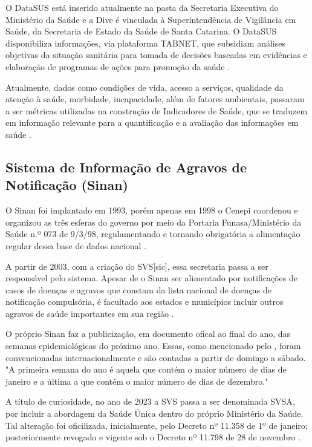 O \acrshort{DataSUS} está inserido atualmente na pasta da Secretaria Executiva do Ministério da Saúde e a \acrfull{Dive} é vinculada à Superintendência de Vigilância em Saúde, da Secretaria de Estado da Saúde de Santa Catarina. O \acrshort{DataSUS} disponibiliza informações, via plataforma TABNET, que subsidiam  análises objetivas da situação sanitária para tomada de decisões baseadas em evidências e elaboração de programas de ações para promoção da saúde \cite{TABNETMinisterio}.

\indent Atualmente, dados como condições de vida, acesso a serviços, qualidade da atenção à saúde, morbidade, incapacidade, além de fatores ambientais, passaram a ser métricas utilizadas na construção de Indicadores de Saúde, que se traduzem em informação relevante para a quantificação e a avaliação das informações em saúde \cite{TABNETMinisterio}.

\subsection{Sistema de Informação de Agravos de Notificação (Sinan)}

\indent O \acrfull{Sinan} foi implantado em 1993, porém apenas em 1998 o \acrfull{Cenepi} coordenou e organizou as três esferas do governo por meio da Portaria \acrshort{Funasa}/Ministério da Saúde n.º 073 de 9/3/98, regulamentando  e tornando obrigatória a alimentação regular dessa base de dados nacional \cite{SINAN07Ministerio}.

\indent A partir de 2003, com a criação do \acrfull{SVS}[sic], essa secretaria passa a ser responsável pelo sistema. Apesar de o \acrshort{Sinan} ser alimentado por notificações  de casos de doenças e agravos que constam da lista nacional de doenças de notificação compulsória, é facultado aos estados e municípios incluir outros agravos de saúde importantes em sua região \cite{SINANWEB, SINAN07Ministerio}.

\indent O próprio \acrshort{Sinan} faz a publicização, em documento ofical ao final do ano, das semanas epidemiológicas do próximo ano. Essas, como mencionado pelo , foram convencionadas internacionalmente e são contadas a partir de domingo a sábado. "A primeira semana do ano é aquela que contém o maior número de dias de janeiro e a última a que contém o maior número de dias de dezembro."

\indent A título de curiosidade, no ano de 2023 a \acrlong{SVS} passa a ser denominada \acrlong{SVSA}, por incluir a abordagem da Saúde Única dentro do próprio Ministério da Saúde. Tal alteração foi oficilizada, inicialmente, pelo Decreto nº 11.358 de 1º de janeiro; posteriormente revogado e vigente sob o Decreto nº 11.798 de 28 de novembro \cite{SVSA2023_1, SVSA2023_2}.


